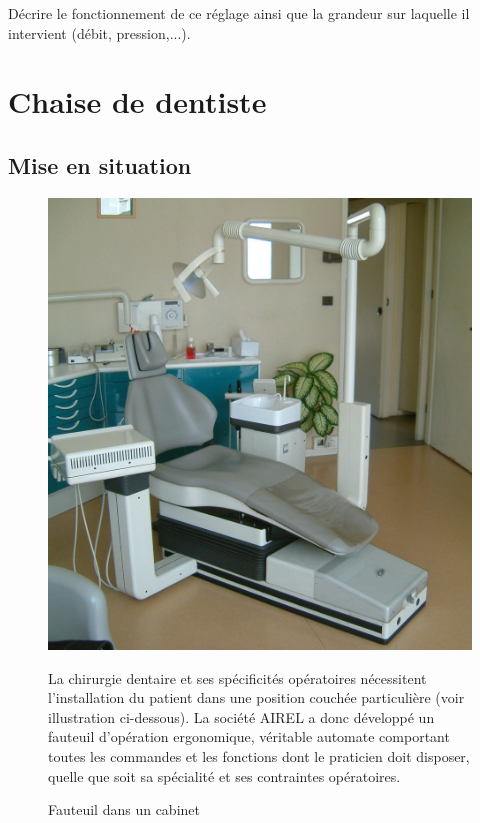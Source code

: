 Décrire le fonctionnement de ce réglage ainsi que la grandeur sur laquelle il intervient (débit, pression,...).

\newpage





\newpage

\section{Chaise de dentiste}

\subsection{Mise en situation}

\begin{figure}[htbp]
\begin{minipage}[c]{.4\linewidth}
\begin{center}
\includegraphics[width=\linewidth]{img/cabinet.jpg}
\caption{Fauteuil dans un cabinet}
\label{fig:image3}
\end{center}
\end{minipage}
\hfill
\begin{minipage}[c]{.55\linewidth}
La chirurgie dentaire et ses spécificités opératoires nécessitent l'installation du patient dans une position couchée particulière (voir illustration ci-dessous). La société AIREL a donc développé un fauteuil d'opération ergonomique, véritable automate comportant toutes les commandes et les fonctions dont le praticien doit disposer, quelle que soit sa spécialité et ses contraintes opératoires.
\end{minipage}
\end{figure}

